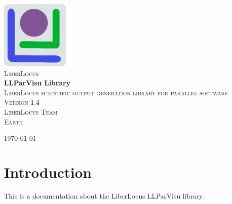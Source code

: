 \documentclass{article}
\begin{document}
\begin{titlepage}
\begin{center}

\includegraphics[width=0.25\textwidth]{figures/LLlogo.eps}~\\[1cm]

\textsc{\LARGE LiberLocus}\\[1.5cm]

{ \huge \bfseries LLParVisu Library}\\[0.4cm]

\textsc{\Large LiberLocus scientific output generation library for parallel software}\\[0.5cm]

\textsc{Version 1.4}\\[3.5cm]

\textsc{\Large LiberLocus Team}\\[1.5cm]

\textsc{\Large Earth}\\[0.5cm]

\vfill

{\large \today}

\end{center}
\end{titlepage}


\section{Introduction}

This is a documentation about the LiberLocus LLParVisu library.

\newpage
\end{document}
